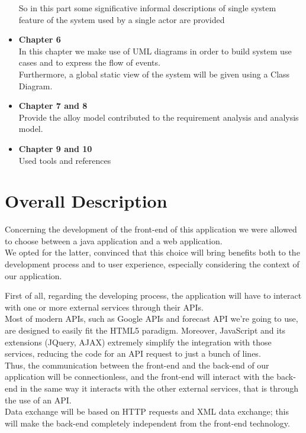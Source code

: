 \documentclass[12pt]{book}
\begin{document}
\begin{itemize}
	So in this part some significative informal descriptions of single system feature of the system used by a single actor are provided \\
	\item{\textbf{Chapter 6}}\\
	In this chapter we make use of UML diagrams in order to build system use cases and to express the flow of events. \\ Furthermore, a global static view of the system will be given using a Class Diagram. 
	\item{\textbf{Chapter 7 and 8}}\\
	Provide the alloy model contributed to the requirement analysis and analysis model. \\
	\item{\textbf{Chapter 9 and 10}}\\
	Used tools and references
\end{itemize}

\chapter{Overall Description}
Concerning the development of the front-end of this application we were allowed to choose between a java application and a web application.\\
We opted for the latter, convinced that this choice will bring benefits both to the development process and to user experience, especially considering the context of our application.\\ \medskip

	First of all, regarding the developing process, the application will have to interact with one or more external services through their APIs.\\ 
Most of modern APIs, such as Google APIs and forecast API we're going to use, are designed to easily fit the HTML5 paradigm. Moreover, JavaScript and its extensions (JQuery, AJAX) extremely simplify the integration with those services, reducing the code for an API request to just a bunch of lines.\\
Thus, the communication between the front-end and the back-end of our application will be connectionless, and the front-end will interact with the back-end in the same way it interacts with the other external services, that is through the use of an API.\\
Data exchange will be based on HTTP requests and XML data exchange; this will make the back-end completely independent from the front-end technology.\\ \medskip
\end{document}
